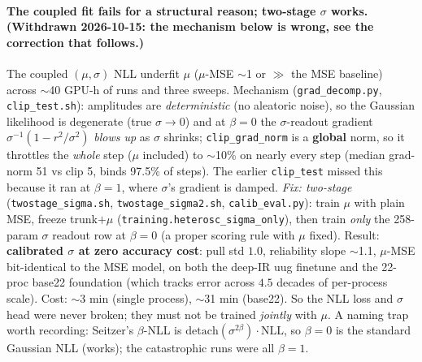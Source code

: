 \documentclass[11pt]{article}
\newcommand{\code}[1]{\texttt{#1}}
\begin{document}
\paragraph{The coupled fit fails for a structural reason; two-stage $\sigma$ works. (Withdrawn 2026-10-15: the mechanism below is wrong, see the correction that follows.)}
The coupled $(\mu,\sigma)$ NLL underfit $\mu$ ($\mu$-MSE $\sim$1 or $\gg$ the MSE baseline) across
$\sim$40 GPU-h of runs and three sweeps. Mechanism (\code{grad\_decomp.py}, \code{clip\_test.sh}):
amplitudes are \emph{deterministic} (no aleatoric noise), so the Gaussian likelihood is degenerate
(true $\sigma\!\to\!0$) and at $\beta{=}0$ the $\sigma$-readout gradient
$\sigma^{-1}(1-r^2/\sigma^2)$ \emph{blows up} as $\sigma$ shrinks; \code{clip\_grad\_norm} is a
\textbf{global} norm, so it throttles the \emph{whole} step ($\mu$ included) to $\sim$10\% on
nearly every step (median grad-norm 51 vs clip 5, binds 97.5\% of steps). The earlier
\code{clip\_test} missed this because it ran at $\beta{=}1$, where $\sigma$'s gradient is damped.
\emph{Fix: two-stage} (\code{twostage\_sigma.sh}, \code{twostage\_sigma2.sh}, \code{calib\_eval.py}):
train $\mu$ with plain MSE, freeze trunk$+\mu$ (\code{training.heterosc\_sigma\_only}), then train
\emph{only} the 258-param $\sigma$ readout row at $\beta{=}0$ (a proper scoring rule with $\mu$
fixed). Result: \textbf{calibrated $\sigma$ at zero accuracy cost}: pull std $1.0$, reliability
slope $\sim$1.1, $\mu$-MSE bit-identical to the MSE model, on both the deep-IR uug finetune and the
22-proc base22 foundation (which tracks error across $4.5$ decades of per-process scale). Cost:
$\sim$3 min (single process), $\sim$31 min (base22). So the NLL loss and $\sigma$ head were never
broken; they must not be trained \emph{jointly} with $\mu$. A naming trap worth recording: Seitzer's
$\beta$-NLL is $\mathrm{detach}(\sigma^{2\beta})\!\cdot\!\text{NLL}$, so $\beta{=}0$ is the standard
Gaussian NLL (works); the catastrophic runs were all $\beta{=}1$.
\end{document}
